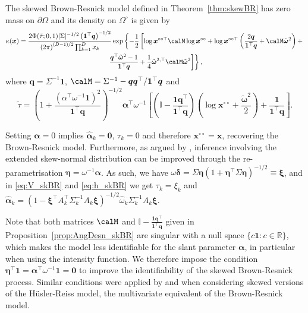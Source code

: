 \documentclass[12pt]{article}
\begin{document}
\begin{proposition}
\label{prop:AngDesn_skBR}
The skewed Brown-Resnick model defined in Theorem~\ref{thm:skewBR} has zero mass on $\partial\Omega$ and its density on $\Omega^\circ$ is given by
%
\begin{multline}
\label{eq:h_skBR}
\kappa(\bm x) =\frac{2\Phi(\tilde{\tau};0,1)| \Sigma |^{-1/2} \left( \bm 1^\top \bm q\right)^{-1/2}}{\left( 2\pi \right)^{(D-1)/2}\prod_{k=1}^D x_k}\exp \left\{ -\frac{1}{2} \left[ \log \bm x^{\circ\circ\top} \calM \log \bm x^{\circ\circ} + \log \bm x^{\circ\circ\top} \left( \frac{2 \bm q}{\bm 1^\top \bm q} + \calM\tilde{\bm\omega}^2\right) + \right.\right. \\ 
\left.\left. \frac{\bm q^\top\tilde{\bm \omega}^2 - 1}{\bm 1 ^\top \bm q} + \frac{1}{4}\tilde{\bm\omega}^{2,\top}\calM\tilde{\bm\omega}^2 \right]\right\},
\end{multline}%
where $\bm q = \Sigma^{-1} \bm 1$, $\calM = \Sigma^{-1} - \bm q \bm q^\top / \bm 1^\top \bm q$ and  
$$\tilde{\tau}=\left(1 + \frac{\left(\alpha^\top\omega^{-1}\bm 1\right)^2}{\bm 1^\top \bm q} \right)^{-1/2} \bm\alpha^\top\omega^{-1}\left[\left(\mathbb{I} - \frac{\bm 1\bm q^\top}{\bm 1^\top \bm q}\right)\left(\log \bm x^{\circ\circ} + \frac{\tilde{\bm\omega}^2}{2}\right) +  \frac{\bm 1}{\bm 1^\top\bm q}  \right].$$
\end{proposition}

Setting $\bm \alpha = 0$ implies $\hat{\bm \alpha}_k = \bm 0$, $\tau_k=0$ and therefore $\bm x^{\circ\circ} = \bm x$, recovering the Brown-Resnick model. Furthermore, as argued by \citet[][Section~5.2]{Azzalini:2013}, inference involving the extended skew-normal distribution can be improved through the re-parametrisation $\bm \eta = \omega^{-1} \bm \alpha$. As such, we have $\omega \bm \delta = \Sigma \bm \eta \left( 1+\bm \eta^\top \Sigma \bm \eta\right)^{-1/2} \equiv \bm \xi$, and in \eqref{eq:V_skBR} and \eqref{eq:h_skBR} we get $\tau_k = \xi_k$ and $\hat{\bm\alpha}_k = \left(1-\bm\xi^\top A_k^\top\Sigma_k^{-1} A_k \bm\xi \right)^{-1/2} \hat{ \omega}_k\Sigma_k^{-1}A_k \bm\xi$. 

Note that both matrices $\calM$ and $\mathbb{I} - \frac{\bm 1\bm q^\top}{\bm 1^\top \bm q}$ given in Proposition~\ref{prop:AngDesn_skBR} are singular with a null space $\{c\bm 1:c\in\mathbb R\}$, which makes the model less identifiable for the slant parameter $\bm \alpha$, in particular when using the intensity function. 
We therefore impose the condition $\bm \eta^\top \bm 1 = \bm \alpha^\top \omega^{-1}  \bm 1 = \bm 0$ 
to improve the identifiability of the skewed Brown-Resnick process. Similar conditions were applied by \citet{Padoan:2011} and \citet{Beranger.etal:2019} when considering skewed versions of the H\"{u}sler-Reiss model, the multivariate equivalent of the Brown-Resnick model. 
\end{document}
